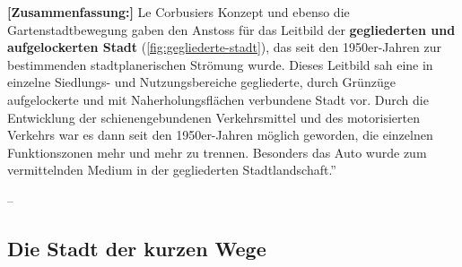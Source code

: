 \begin{textBox}[title=Die gegliederte Stadt]
\textbf{[Zusammenfassung:]} Le Corbusiers Konzept und ebenso die Gartenstadtbewegung gaben den Anstoss für das Leitbild der \textbf{gegliederten und aufgelockerten Stadt} (\cref{fig:gegliederte-stadt}), das seit den 1950er-Jahren zur bestimmenden stadtplanerischen Strömung wurde. Dieses Leitbild sah eine in einzelne Siedlungs- und Nutzungsbereiche gegliederte, durch Grünzüge aufgelockerte und mit Naherholungsflächen verbundene Stadt vor. Durch die Entwicklung der schienengebundenen Verkehrsmittel und des motorisierten Verkehrs war es dann seit den 1950er-Jahren möglich geworden, die einzelnen Funktionszonen mehr und mehr zu trennen. Besonders das Auto wurde zum vermittelnden Medium in der gegliederten Stadtlandschaft.''

--\textcite{westermann}

\end{textBox}

\subsection{Die Stadt der kurzen Wege}

